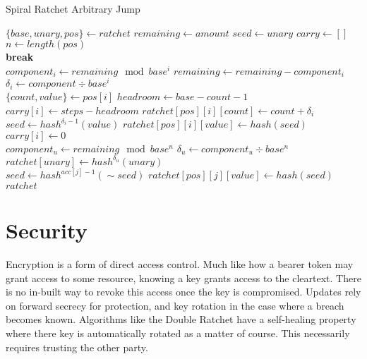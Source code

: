\documentclass{article}
\begin{document}
	\begin{algorithm}
		\caption{Spiral Ratchet Arbitrary Jump}
		\label{alg:jump}
		
		\begin{algorithmic}[1]
				\State $\{base, unary, pos\} \gets ratchet$
				\State $remaining \gets amount$
				\State $seed \gets unary$
				\State $carry \gets []$
				\State $n \gets length(pos)$
				\\
						\State \textbf{break}
					\EndIf
					\\
					\State $component_{i} \gets remaining\mod{base^{i}}$
					\State $remaining \gets remaining - component_{i}$
					\State $\delta_{i} \gets component\div{base^{i}}$
					\\
					\State $\{count, value\} \gets pos[i]$
					\State $headroom \gets base - count - 1$
					\\
						\State $carry[i] \gets steps - headroom$
					\Else
						\State $ratchet[pos][i][count] \gets count + \delta_{i}$
							\State $seed \gets hash^{\delta_{i} - 	1}(value)$
							\State $ratchet[pos][i][value] \gets hash(seed)$
						\Else
							\State $carry[i] \gets 0$
						\EndIf
					\EndIf
				\EndFor
				\\
					\State $component_{u} \gets remaining \mod{base^{n}}$
					\State $\delta_{u} \gets component_{u}\div{base^{n}}$
					\State $ratchet[unary] \gets hash^{\delta_{u}}(unary)$
				\EndIf
				\\
				 
					\State $seed \gets hash^{acc[j] - 1}(\sim{seed})$
					\State $ratchet[pos][j][value] \gets hash(seed)$
				\EndFor
				\\
				\State $ratchet$
			\EndFunction
		\end{algorithmic}
	\end{algorithm}

	\section{Security}
	
	Encryption is a form of direct access control. Much like how a bearer token may grant access to some resource, knowing a key grants access to the cleartext. There is no in-built way to revoke this access once the key is compromised. Updates rely on forward secrecy for protection, and key rotation in the case where a breach becomes known. Algorithms like the Double Ratchet\cite{double-ratchet} have a self-healing property where there key is automatically rotated as a matter of course. This necessarily requires trusting the other party.
	
\end{document}
